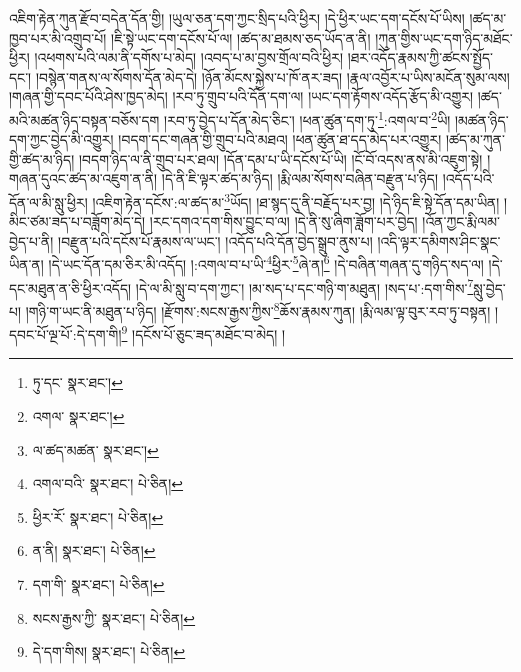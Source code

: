 འཇིག་རྟེན་ཀུན་རྫོབ་བདེན་དོན་གྱི། །ཡུལ་ཅན་དག་ཀྱང་སྲིད་པའི་ཕྱིར། །དེ་ཕྱིར་ཡང་དག་དངོས་པོ་ཡིས། །ཚད་མ་ཁྱབ་པར་མི་འགྲུབ་པོ། །ཇི་སྟེ་ཡང་དག་དངོས་པོ་ལ། །ཚད་མ་ཐམས་ཅད་ཡོད་ན་ནི། །ཀུན་གྱིས་ཡང་དག་ཉིད་མཐོང་ཕྱིར། །འཕགས་པའི་ལམ་ནི་དགོས་པ་མེད། །འབད་པ་མ་བྱས་གྲོལ་བའི་ཕྱིར། །ཐར་འདོད་རྣམས་ཀྱི་ཚངས་སྤྱོད་དང་། །བསྙེན་གནས་ལ་སོགས་དོན་མེད་དེ། །ཉོན་མོངས་སྐྱེས་པ་ཁོ་ནར་ཟད། །རྣལ་འབྱོར་པ་ཡིས་མངོན་སུམ་ལས། །གཞན་གྱི་དབང་པོའི་ཤེས་ཁྱད་མེད། །རབ་ཏུ་གྲུབ་པའི་དོན་དག་ལ། །ཡང་དག་རྟོགས་འདོད་རྩོད་མི་འགྱུར། །ཚད་མའི་མཚན་ཉིད་བསྟན་བཅོས་དག །རབ་ཏུ་བྱེད་པ་དོན་མེད་ཅིང་། །ཕན་ཚུན་དག་ཏུ་\footnote{ཏུ་དང་  སྣར་ཐང་། }:འགལ་བ་\footnote{འགལ་  སྣར་ཐང་། }ཡི། །མཚན་ཉིད་དག་ཀྱང་བྱེད་མི་འགྱུར། །བདག་དང་གཞན་གྱི་གྲུབ་པའི་མཐའ། །ཕན་ཚུན་ཐ་དད་མེད་པར་འགྱུར། །ཚད་མ་ཀུན་གྱི་ཚད་མ་ཉིད། །བདག་ཉིད་ལ་ནི་གྲུབ་པར་ཐལ། །དོན་དམ་པ་ཡི་དངོས་པོ་ཡི། །ངོ་བོ་འདས་ནས་མི་འཇུག་སྟེ། །གཞན་དུའང་ཚད་མ་འཇུག་ན་ནི། །དེ་ནི་ཇི་ལྟར་ཚད་མ་ཉིད། །རྨི་ལམ་སོགས་བཞིན་བརྫུན་པ་ཉིད། །འདོད་པའི་དོན་ལ་མི་སླུ་ཕྱིར། །འཇིག་རྟེན་དངོས་:ལ་ཚད་མ་\footnote{ལ་ཚད་མཚན་  སྣར་ཐང་། }ཡོད། །ཐ་སྙད་དུ་ནི་བརྗོད་པར་བྱ། །དེ་ཉིད་ཇི་སྟེ་དོན་དམ་ཡིན། །མིང་ཙམ་ཟད་པ་བཟློག་མེད་དེ། །རང་དགའ་དག་གིས་བྱུང་བ་ལ། །དེ་ནི་སུ་ཞིག་ཟློག་པར་བྱེད། །འོན་ཀྱང་རྨི་ལམ་བྱེད་པ་ནི། །བརྫུན་པའི་དངོས་པོ་རྣམས་ལ་ཡང་། །འདོད་པའི་དོན་བྱེད་སྒྲུབ་ནུས་པ། །འདི་ལྟར་དམིགས་ཤིང་སྣང་ཡིན་ན། །དེ་ཡང་དོན་དམ་ཅིར་མི་འདོད། །:འགལ་བ་པ་ཡི་\footnote{འགལ་བའི་  སྣར་ཐང་།  པེ་ཅིན། }ཕྱིར་\footnote{ཕྱིར་རོ་  སྣར་ཐང་།  པེ་ཅིན། }ཞེ་ན།\footnote{ན་ནི།  སྣར་ཐང་།  པེ་ཅིན། } །དེ་བཞིན་གཞན་དུ་གཉིད་སད་ལ། །དེ་དང་མཐུན་ན་ཅི་ཕྱིར་འདོད། །དེ་ལ་མི་སླུ་བ་དག་ཀྱང་། །མ་སད་པ་དང་གཉི་ག་མཐུན། །སད་པ་:དག་གིས་\footnote{དག་གི་  སྣར་ཐང་།  པེ་ཅིན། }སླུ་བྱེད་པ། །གཉི་ག་ཡང་ནི་མཐུན་པ་ཉིད། །རྫོགས་:སངས་རྒྱས་ཀྱིས་\footnote{སངས་རྒྱས་ཀྱི་  སྣར་ཐང་།  པེ་ཅིན། }ཆོས་རྣམས་ཀུན། །རྨི་ལམ་ལྟ་བུར་རབ་ཏུ་བསྟན། །དབང་པོ་ལྔ་པོ་:དེ་དག་གི།\footnote{དེ་དག་གིས།  སྣར་ཐང་།  པེ་ཅིན། } །དངོས་པོ་ཅུང་ཟད་མཐོང་བ་མེད། །
